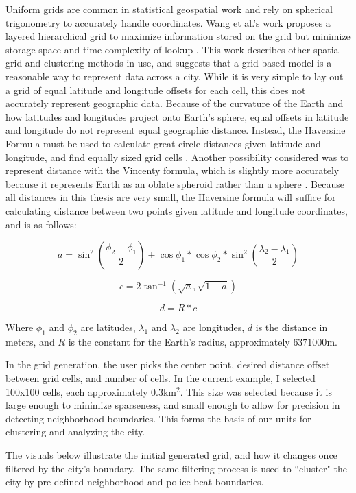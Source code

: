\documentclass[times new roman,12pt]{article}
\begin{document}
Uniform grids are common in statistical geospatial work and rely on spherical trigonometry to accurately handle coordinates. Wang et al.'s work proposes a layered hierarchical grid to maximize information stored on the grid but minimize storage space and time complexity of lookup \cite{wang_urban_2018}. This work describes other spatial grid and clustering methods in use, and suggests that a grid-based model is a reasonable way to represent data across a city. While it is very simple to lay out a grid of equal latitude and longitude offsets for each cell, this does not accurately represent geographic data. Because of the curvature of the Earth and how latitudes and longitudes project onto Earth's sphere, equal offsets in latitude and longitude do not represent equal geographic distance. Instead, the Haversine Formula must be used to calculate great circle distances given latitude and longitude, and find equally sized grid cells \cite{gellert_w._haversine_1989}. Another possibility considered was to represent distance with the Vincenty formula, which is slightly more accurately because it represents Earth as an oblate spheroid rather than a sphere \cite{vincenty}. Because all distances in this thesis are very small, the Haversine formula will suffice for calculating distance between two points given latitude and longitude coordinates, and is as follows:

$$ a = \sin^{2}(\frac{\phi_2-\phi_1}{2}) + \cos{\phi_1}*\cos{\phi_2}*\sin^{2}(\frac{\lambda_2-\lambda_1}{2})$$

$$ c = 2\tan^{-1}(\sqrt{a}, \sqrt{1-a})$$

$$ d = R*c$$

Where $\phi_1$ and $\phi_2$ are latitudes, $\lambda_1$ and $\lambda_2$ are longitudes, $d$ is the distance in meters, and $R$ is the constant for the Earth's radius, approximately $6371000$m. 

In the grid generation, the user picks the center point, desired distance offset between grid cells, and number of cells. In the current example, I selected 100x100 cells, each approximately $0.3$km$^2$. This size was selected because it is large enough to minimize sparseness, and small enough to allow for precision in detecting neighborhood boundaries. This forms the basis of our units for clustering and analyzing the city.

The visuals below illustrate the initial generated grid, and how it changes once filtered by the city's boundary. The same filtering process is used to ``cluster" the city by pre-defined neighborhood and police beat boundaries. 
\end{document}
